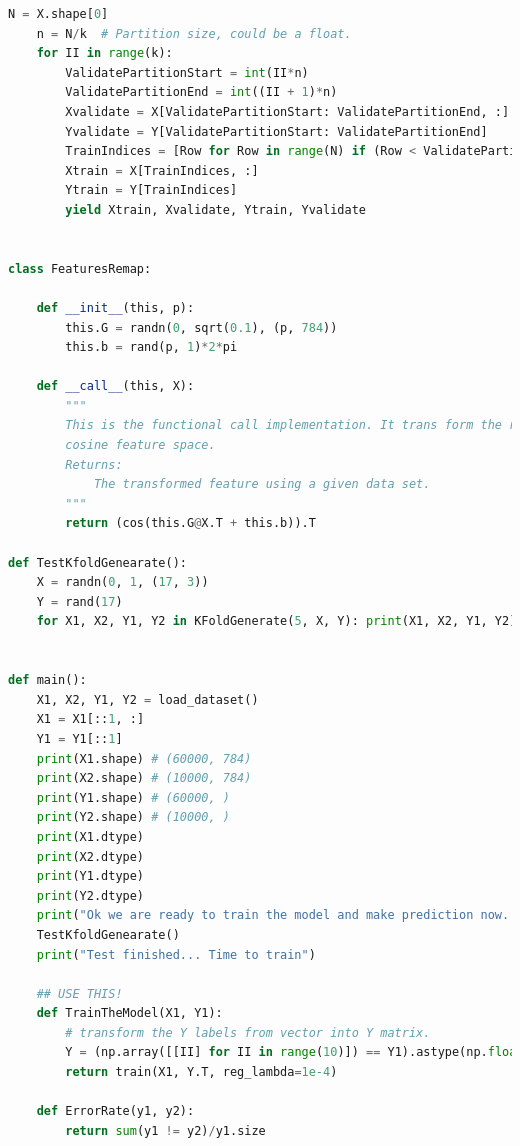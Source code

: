 \documentclass[]{article}
\begin{document}
\begin{lstlisting}[language=python]
	N = X.shape[0]
	n = N/k  # Partition size, could be a float.
	for II in range(k):
		ValidatePartitionStart = int(II*n)
		ValidatePartitionEnd = int((II + 1)*n)
		Xvalidate = X[ValidatePartitionStart: ValidatePartitionEnd, :]
		Yvalidate = Y[ValidatePartitionStart: ValidatePartitionEnd]
		TrainIndices = [Row for Row in range(N) if (Row < ValidatePartitionStart or Row >= ValidatePartitionEnd)]
		Xtrain = X[TrainIndices, :]
		Ytrain = Y[TrainIndices]
		yield Xtrain, Xvalidate, Ytrain, Yvalidate


class FeaturesRemap:

	def __init__(this, p):
		this.G = randn(0, sqrt(0.1), (p, 784))
		this.b = rand(p, 1)*2*pi

	def __call__(this, X):
		"""
		This is the functional call implementation. It trans form the row data matrix to the new
		cosine feature space.
		Returns:
			The transformed feature using a given data set.
		"""
		return (cos(this.G@X.T + this.b)).T

def TestKfoldGenearate():
	X = randn(0, 1, (17, 3))
	Y = rand(17)
	for X1, X2, Y1, Y2 in KFoldGenerate(5, X, Y): print(X1, X2, Y1, Y2)


def main():
	X1, X2, Y1, Y2 = load_dataset()
	X1 = X1[::1, :]
	Y1 = Y1[::1]
	print(X1.shape) # (60000, 784)
	print(X2.shape) # (10000, 784)
	print(Y1.shape) # (60000, )
	print(Y2.shape) # (10000, )
	print(X1.dtype)
	print(X2.dtype)
	print(Y1.dtype)
	print(Y2.dtype)
	print("Ok we are ready to train the model and make prediction now. ")
	TestKfoldGenearate()
	print("Test finished... Time to train")

	## USE THIS!
	def TrainTheModel(X1, Y1):
		# transform the Y labels from vector into Y matrix.
		Y = (np.array([[II] for II in range(10)]) == Y1).astype(np.float)
		return train(X1, Y.T, reg_lambda=1e-4)

	def ErrorRate(y1, y2):
		return sum(y1 != y2)/y1.size


\end{lstlisting}
\end{document}
